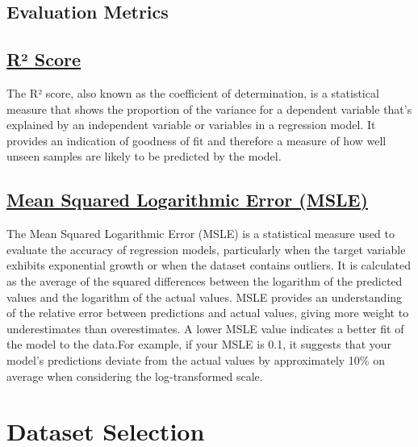 \documentclass[conference]{IEEEtran}
\begin{document}
    \subsection*{Evaluation Metrics}

    \subsection*{\href{https://en.wikipedia.org/wiki/Coefficient_of_determination}{R² Score}}
        The R² score, also known as the coefficient of determination, is a statistical measure that shows the proportion of the variance for a dependent variable that's explained by an independent variable or variables in a regression model. It provides an indication of goodness of fit and therefore a measure of how well unseen samples are likely to be predicted by the model.

    \subsection*{\href{https://scikit-learn.org/stable/modules/generated/sklearn.metrics.mean_squared_log_error.html}{Mean Squared Logarithmic Error (MSLE)}}
        The Mean Squared Logarithmic Error (MSLE) is a statistical measure used to evaluate the accuracy of regression models, particularly when the target variable exhibits exponential growth or when the dataset contains outliers. It is calculated as the average of the squared differences between the logarithm of the predicted values and the logarithm of the actual values. MSLE provides an understanding of the relative error between predictions and actual values, giving more weight to underestimates than overestimates. A lower MSLE value indicates a better fit of the model to the data.For example, if your MSLE is 0.1, it suggests that your model's predictions deviate from the actual values by approximately 10\% on average when considering the log-transformed scale.

\section{Dataset Selection}
\end{document}

